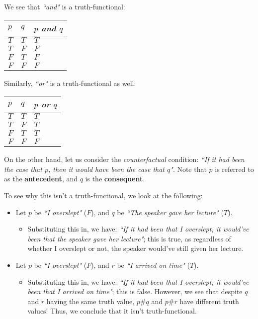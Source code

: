 \documentclass[openany]{book}
\begin{document}
\begin{example}
	We see that \textit{``and"} is a truth-functional:
	\begin{center}
		\begin{tabularx}{150pt}{X|X|X}
			$p$ & $q$ & \textit{$p$ and $q$} \\
			\hline
			$T$ & $T$ & $T$ \\
			\hline
			$T$ & $F$ & $F$ \\
			\hline
			$F$ & $T$ & $F$ \\
			\hline
			$F$ & $F$ & $F$
		\end{tabularx}
	\end{center}

	Similarly, \textit{``or"} is a truth-functional as well:
	\begin{center}
		\begin{tabularx}{150pt}{X|X|X}
			$p$ & $q$ & \textit{$p$ or $q$} \\
			\hline
			$T$ & $T$ & $T$ \\
			\hline
			$T$ & $F$ & $T$ \\
			\hline
			$F$ & $T$ & $T$ \\
			\hline
			$F$ & $F$ & $F$
		\end{tabularx}
	\end{center}

	On the other hand, let us consider the \textit{counterfactual} condition: \textit{``If it had been the case that $p$, then it would have been the case that $q$"}. Note that $p$ is referred to as the \textbf{antecedent}, and $q$ is the \textbf{consequent}.
	
	To see why this isn't a truth-functional, we look at the following:
	\begin{itemize}
		\item Let $p$ be \textit{``I overslept"} ($F$), and $q$ be \textit{``The speaker gave her lecture"} ($T$).
		\begin{itemize}
			\item Substituting this in, we have: \textit{``If it had been that I overslept, it would've been that the speaker gave her lecture"}; this is true, as regardless of whether I overslept or not, the speaker would've still given her lecture.
		\end{itemize}
		\item Let $p$ be \textit{``I overslept"} ($F$), and $r$ be \textit{``I arrived on time"} ($T$).
		\begin{itemize}
			\item Substituting this in, we have: \textit{``If it had been that I overslept, it would've been that I arrived on time"}; this is false. However, we see that despite $q$ and $r$ having the same truth value, $p\#q$ and $p\#r$ have different truth values! Thus, we conclude that it isn't truth-functional.
		\end{itemize}
	\end{itemize}
\end{example}

\section{}
\end{document}
